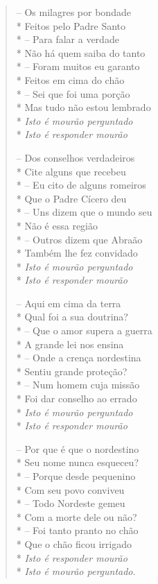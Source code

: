 \begin{verse}
-- Os milagres por bondade\\*
Feitos pelo Padre Santo\\*
-- Para falar a verdade\\*
Não há quem saiba do tanto\\*
-- Foram muitos eu garanto\\*
Feitos em cima do chão\\*
-- Sei que foi uma porção\\*
Mas tudo não estou lembrado\\*
\textit{Isto é mourão perguntado}\\*
\textit{Isto é responder mourão}

-- Dos conselhos verdadeiros\\*
Cite alguns que recebeu\\*
-- Eu cito de alguns romeiros\\*
Que o Padre Cícero deu\\*
-- Uns dizem que o mundo seu\\*
Não é essa região\\*
-- Outros dizem que Abraão\\*
Também lhe fez convidado\\*
\textit{Isto é mourão perguntado}\\*
\textit{Isto é responder mourão}

-- Aqui em cima da terra\\*
Qual foi a sua doutrina?\\*
-- Que o amor supera a guerra\\*
A grande lei nos ensina\\*
-- Onde a crença nordestina\\*
Sentiu grande proteção?\\*
-- Num homem cuja missão\\*
Foi dar conselho ao errado\\*
\textit{Isto é mourão perguntado}\\*
\textit{Isto é responder mourão}

-- Por que é que o nordestino\\*
Seu nome nunca esqueceu?\\*
-- Porque desde pequenino\\*
Com seu povo conviveu\\*
-- Todo Nordeste gemeu\\*
Com a morte dele ou não?\\*
-- Foi tanto pranto no chão\\*
Que o chão ficou irrigado\\*
\textit{Isto é responder mourão}\\*
\textit{Isto é mourão perguntado}.
\end{verse}


